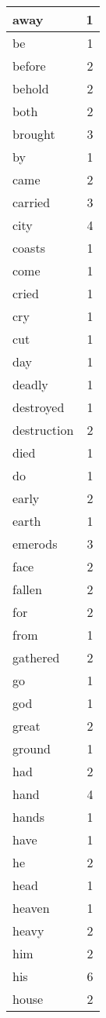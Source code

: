 \begin{center}
\begin{longtable}{l|r}
away & 1 \\ \hline
be & 1 \\ \hline
before & 2 \\ \hline
behold & 2 \\ \hline
both & 2 \\ \hline
brought & 3 \\ \hline
by & 1 \\ \hline
came & 2 \\ \hline
carried & 3 \\ \hline
city & 4 \\ \hline
coasts & 1 \\ \hline
come & 1 \\ \hline
cried & 1 \\ \hline
cry & 1 \\ \hline
cut & 1 \\ \hline
day & 1 \\ \hline
deadly & 1 \\ \hline
destroyed & 1 \\ \hline
destruction & 2 \\ \hline
died & 1 \\ \hline
do & 1 \\ \hline
early & 2 \\ \hline
earth & 1 \\ \hline
emerods & 3 \\ \hline
face & 2 \\ \hline
fallen & 2 \\ \hline
for & 2 \\ \hline
from & 1 \\ \hline
gathered & 2 \\ \hline
go & 1 \\ \hline
god & 1 \\ \hline
great & 2 \\ \hline
ground & 1 \\ \hline
had & 2 \\ \hline
hand & 4 \\ \hline
hands & 1 \\ \hline
have & 1 \\ \hline
he & 2 \\ \hline
head & 1 \\ \hline
heaven & 1 \\ \hline
heavy & 2 \\ \hline
him & 2 \\ \hline
his & 6 \\ \hline
house & 2 \\ \hline

\end{longtable}
\end{center}
